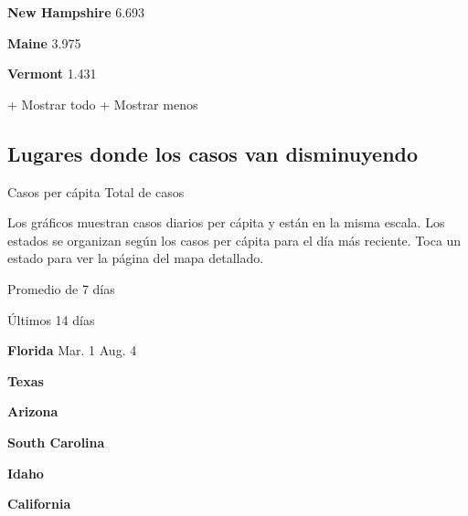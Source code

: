 \textbf{New Hampshire} 6.693

\href{https://www.nytimes3xbfgragh.onion/interactive/2020/us/maine-coronavirus-cases.html}{}

\textbf{Maine} 3.975

\href{https://www.nytimes3xbfgragh.onion/interactive/2020/us/vermont-coronavirus-cases.html}{}

\textbf{Vermont} 1.431

+ Mostrar todo + Mostrar menos

\hypertarget{lugares-donde-los-casos-van-disminuyendo}{%
\subsection{Lugares donde los casos van
disminuyendo}\label{lugares-donde-los-casos-van-disminuyendo}}

Casos per cápita Total de casos

Los gráficos muestran casos diarios per cápita y están en la misma
escala. Los estados se organizan según los casos per cápita para el día
más reciente. Toca un estado para ver la página del mapa detallado.

\href{https://www.nytimes3xbfgragh.onion/interactive/2020/us/florida-coronavirus-cases.html}{}

Promedio de 7 días

Últimos 14 días

\textbf{Florida} Mar. 1 Aug. 4

\href{https://www.nytimes3xbfgragh.onion/interactive/2020/us/texas-coronavirus-cases.html}{}

\textbf{Texas}

\href{https://www.nytimes3xbfgragh.onion/interactive/2020/us/arizona-coronavirus-cases.html}{}

\textbf{Arizona}

\href{https://www.nytimes3xbfgragh.onion/interactive/2020/us/south-carolina-coronavirus-cases.html}{}

\textbf{South Carolina}

\href{https://www.nytimes3xbfgragh.onion/interactive/2020/us/idaho-coronavirus-cases.html}{}

\textbf{Idaho}

\href{https://www.nytimes3xbfgragh.onion/interactive/2020/us/california-coronavirus-cases.html}{}

\textbf{California}

\href{https://www.nytimes3xbfgragh.onion/interactive/2020/us/iowa-coronavirus-cases.html}{}

